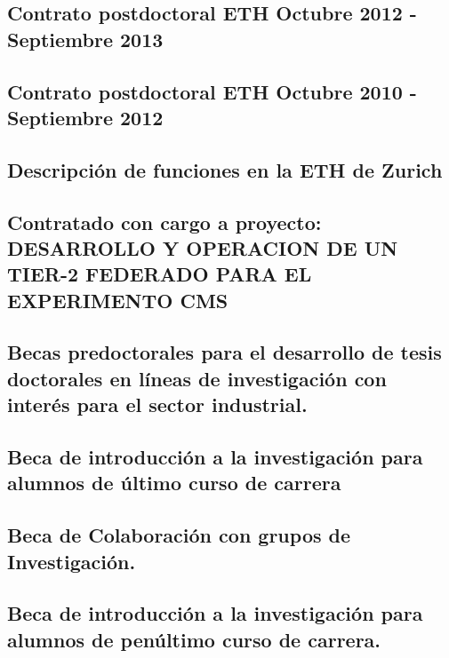 \documentclass[a4paper, 11pt, twoside, openright]{report}
\begin{document}
\subsection{Contrato postdoctoral ETH Octubre 2012 - Septiembre 2013}

\subsection{Contrato postdoctoral ETH Octubre 2010 - Septiembre 2012}

\subsection{Descripción de funciones en la ETH de Zurich}

\subsection{Contratado con cargo a proyecto: DESARROLLO Y OPERACION DE UN TIER-2 FEDERADO PARA EL EXPERIMENTO CMS}

\subsection{Becas predoctorales para el desarrollo de tesis doctorales en líneas de investigación con interés para el sector industrial.}

\subsection{Beca de introducción a la investigación para alumnos de último curso de carrera}

\subsection{Beca de Colaboración con grupos de Investigación.}

\subsection{Beca de introducción a la investigación para alumnos de penúltimo curso de carrera.}

\end{document}
